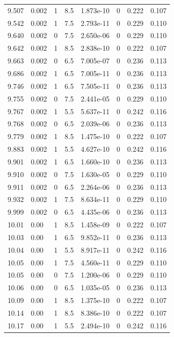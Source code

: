 \documentclass[preview]{standalone}
\begin{document}
{{{{{{{{\begin{tabular}{L{1.2cm}C{1.2cm} C{0.3cm}C{0.5cm} C{1.4cm}C{1.4cm} C{1.4cm}C{1.4cm}}
  9.507  &  0.002  & 1     & 8.5 &  1.873e-10  & 0  & 0.222 &  0.107   \\ 
  9.542  &  0.002  & 1     & 7.5 &  2.793e-11  & 0  & 0.229 &  0.110   \\ 
  9.640  &  0.002  & 0     & 7.5 &  2.650e-06  & 0  & 0.229 &  0.110   \\ 
  9.642  &  0.002  & 1     & 8.5 &  2.838e-10  & 0  & 0.222 &  0.107   \\ 
  9.663  &  0.002  & 0     & 6.5 &  7.005e-07  & 0  & 0.236 &  0.113   \\ 
  9.686  &  0.002  & 1     & 6.5 &  7.005e-11  & 0  & 0.236 &  0.113   \\ 
  9.746  &  0.002  & 1     & 6.5 &  7.505e-11  & 0  & 0.236 &  0.113   \\ 
  9.755  &  0.002  & 0     & 7.5 &  2.441e-05  & 0  & 0.229 &  0.110   \\ 
  9.767  &  0.002  & 1     & 5.5 &  5.637e-11  & 0  & 0.242 &  0.116   \\ 
  9.768  &  0.002  & 0     & 6.5 &  2.039e-06  & 0  & 0.236 &  0.113   \\ 
  9.779  &  0.002  & 1     & 8.5 &  1.475e-10  & 0  & 0.222 &  0.107   \\ 
  9.883  &  0.002  & 1     & 5.5 &  4.627e-10  & 0  & 0.242 &  0.116   \\ 
  9.901  &  0.002  & 1     & 6.5 &  1.660e-10  & 0  & 0.236 &  0.113   \\ 
  9.910  &  0.002  & 0     & 7.5 &  1.630e-05  & 0  & 0.229 &  0.110   \\ 
  9.911  &  0.002  & 0     & 6.5 &  2.264e-06  & 0  & 0.236 &  0.113   \\ 
  9.932  &  0.002  & 1     & 7.5 &  8.634e-11  & 0  & 0.229 &  0.110   \\ 
  9.999  &  0.002  & 0     & 6.5 &  4.435e-06  & 0  & 0.236 &  0.113   \\ 
  10.01  &  0.00  & 1     & 8.5 &  1.458e-09  & 0  & 0.222 &  0.107   \\ 
  10.03  &  0.00  & 1     & 6.5 &  9.852e-11  & 0  & 0.236 &  0.113   \\ 
  10.04  &  0.00  & 1     & 5.5 &  8.917e-11  & 0  & 0.242 &  0.116   \\ 
  10.05  &  0.00  & 1     & 7.5 &  4.560e-11  & 0  & 0.229 &  0.110   \\ 
  10.05  &  0.00  & 0     & 7.5 &  1.200e-06  & 0  & 0.229 &  0.110   \\ 
  10.06  &  0.00  & 0     & 6.5 &  1.035e-05  & 0  & 0.236 &  0.113   \\ 
  10.09  &  0.00  & 1     & 8.5 &  1.375e-10  & 0  & 0.222 &  0.107   \\ 
  10.14  &  0.00  & 1     & 8.5 &  8.386e-10  & 0  & 0.222 &  0.107   \\ 
  10.17  &  0.00  & 1     & 5.5 &  2.494e-10  & 0  & 0.242 &  0.116   \\ 
\hline 
\end{tabular} 

}}}}}}}}
\end{document}
